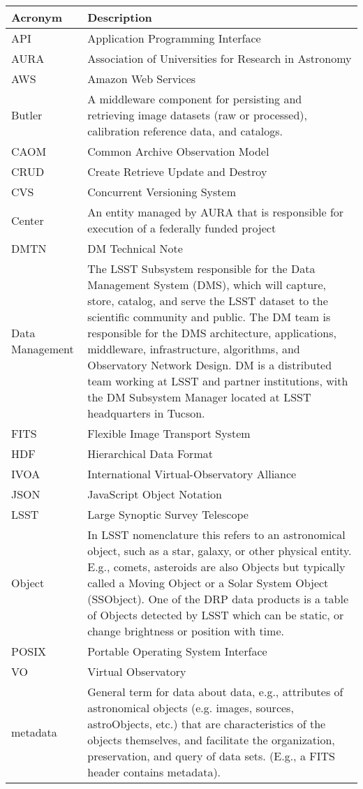 \addtocounter{table}{-1}
\begin{longtable}{|l|p{}|}\hline
\textbf{Acronym} & \textbf{Description}  \\\hline

API & Application Programming Interface \\\hline
AURA & Association of Universities for Research in Astronomy \\\hline
AWS & Amazon Web Services \\\hline
Butler & A middleware component for persisting and retrieving image datasets (raw or processed), calibration reference data, and catalogs. \\\hline
CAOM & Common Archive Observation Model \\\hline
CRUD & Create Retrieve Update and Destroy \\\hline
CVS & Concurrent Versioning System \\\hline
Center & An entity managed by AURA that is responsible for execution of a federally funded project \\\hline
DMTN & DM Technical Note \\\hline
Data Management & The LSST Subsystem responsible for the Data Management System (DMS), which will capture, store, catalog, and serve the LSST dataset to the scientific community and public. The DM team is responsible for the DMS architecture, applications, middleware, infrastructure, algorithms, and Observatory Network Design. DM is a distributed team working at LSST and partner institutions, with the DM Subsystem Manager located at LSST headquarters in Tucson. \\\hline
FITS & Flexible Image Transport System \\\hline
HDF & Hierarchical Data Format \\\hline
IVOA & International Virtual-Observatory Alliance \\\hline
JSON & JavaScript Object Notation \\\hline
LSST & Large Synoptic Survey Telescope \\\hline
Object & In LSST nomenclature this refers to an astronomical object, such as a star, galaxy, or other physical entity. E.g., comets, asteroids are also Objects but typically called a Moving Object or a Solar System Object (SSObject). One of the DRP data products is a table of Objects detected by LSST which can be static, or change brightness or position with time. \\\hline
POSIX & Portable Operating System Interface \\\hline
VO & Virtual Observatory \\\hline
metadata & General term for data about data, e.g., attributes of astronomical objects (e.g. images, sources, astroObjects, etc.) that are characteristics of the objects themselves, and facilitate the organization, preservation, and query of data sets. (E.g., a FITS header contains metadata). \\\hline
\end{longtable}
